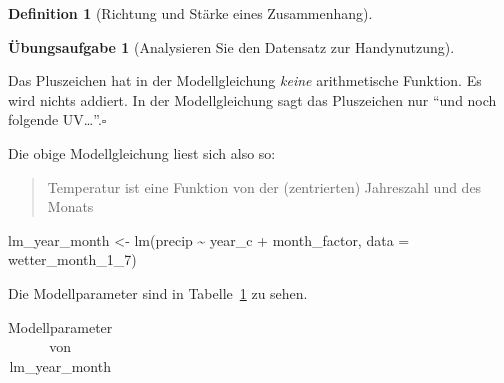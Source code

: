 \documentclass[
  a4paper,
  DIV=11]{scrreprt}
\newenvironment{Shaded}{\begin{snugshade}}{\end{snugshade}}
\newcommand{\AttributeTok}[1]{\textcolor[rgb]{0.40,0.45,0.13}{#1}}
\newcommand{\FunctionTok}[1]{\textcolor[rgb]{0.28,0.35,0.67}{#1}}
\newcommand{\NormalTok}[1]{\textcolor[rgb]{0.00,0.23,0.31}{#1}}
\newcommand{\OtherTok}[1]{\textcolor[rgb]{0.00,0.23,0.31}{#1}}
\newcommand{\SpecialCharTok}[1]{\textcolor[rgb]{0.37,0.37,0.37}{#1}}
\theoremstyle{definition}
\newtheorem{exercise}{Übungsaufgabe}[chapter]
\theoremstyle{definition}
\theoremstyle{definition}
\newtheorem{definition}{Definition}[chapter]
\theoremstyle{remark}
\begin{document}
\begin{definition}[Richtung und Stärke eines
Zusammenhang]
\begin{exercise}[Analysieren Sie den Datensatz zur
Handynutzung]
\begin{tcolorbox}
Das Pluszeichen hat in der Modellgleichung\footnotemark{} \emph{keine}
arithmetische Funktion. Es wird nichts addiert. In der Modellgleichung
sagt das Pluszeichen nur ``und noch folgende UV\ldots{}''.\(\square\)

\end{tcolorbox}


Die obige Modellgleichung liest sich also so:

\begin{quote}
Temperatur ist eine Funktion von der (zentrierten) Jahreszahl und des
Monats
\end{quote}

\begin{Shaded}
\begin{Highlighting}[]
\NormalTok{lm\_year\_month }\OtherTok{\textless{}{-}} \FunctionTok{lm}\NormalTok{(precip }\SpecialCharTok{\textasciitilde{}}\NormalTok{ year\_c }\SpecialCharTok{+}\NormalTok{ month\_factor, }\AttributeTok{data =}\NormalTok{ wetter\_month\_1\_7)}
\end{Highlighting}
\end{Shaded}

Die Modellparameter sind in Tabelle~\ref{tbl-lm_year_month} zu sehen.

\begin{longtable}[]{@{}
  >{\raggedright\arraybackslash}p{}
  >{\centering\arraybackslash}p{}
  >{\centering\arraybackslash}p{}
  >{\centering\arraybackslash}p{}
  >{\centering\arraybackslash}p{}
  >{\centering\arraybackslash}p{}@{}}

\caption{\label{tbl-lm_year_month}Modellparameter von lm\_year\_month}

\tabularnewline


\end{longtable}
\end{exercise}
\end{definition}
\end{document}
